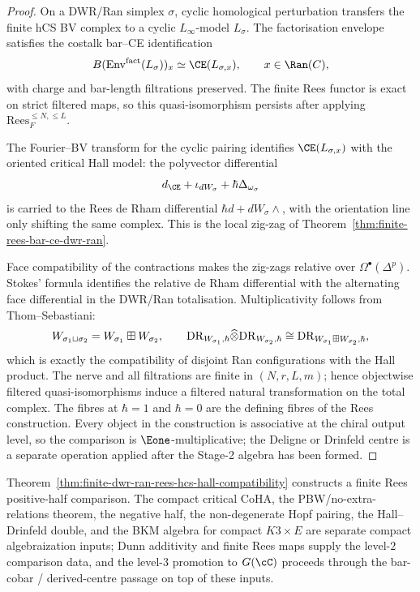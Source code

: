 \begin{proof}
On a DWR/Ran simplex \(\sigma\), cyclic homological perturbation
transfers the finite hCS BV complex to a cyclic \(L_\infty\)-model
\(L_\sigma\).  The factorisation envelope satisfies the costalk
bar--CE identification
\[
 B(\Env^{\mathrm{fact}}(L_\sigma))_x\simeq \CE(L_{\sigma,x}),
 \qquad x\in\Ran(C),
\]
with charge and bar-length filtrations preserved.  The finite Rees
functor is exact on strict filtered maps, so this quasi-isomorphism
persists after applying
\(\mathrm{Rees}_{F}^{\le N,\le L}\).

The Fourier--BV transform for the cyclic pairing identifies
\(\CE(L_{\sigma,x})\) with the oriented critical Hall model: the
polyvector differential
\[
 d_{\CE}+\iota_{dW_\sigma}+\hbar\Delta_{\omega_\sigma}
\]
is carried to the Rees de Rham differential
\(\hbar d+dW_\sigma\wedge\), with the orientation line only shifting
the same complex.  This is the local zig-zag of
Theorem~\ref{thm:finite-rees-bar-ce-dwr-ran}.

Face compatibility of the contractions makes the zig-zags relative
over \(\Omega^\bullet(\Delta^p)\).  Stokes' formula identifies the
relative de Rham differential with the alternating face differential
in the DWR/Ran totalisation.  Multiplicativity follows from
Thom--Sebastiani:
\[
 W_{\sigma_1\sqcup\sigma_2}=W_{\sigma_1}\boxplus W_{\sigma_2},
 \qquad
 \mathrm{DR}_{W_{\sigma_1},\hbar}\widehat\otimes
 \mathrm{DR}_{W_{\sigma_2},\hbar}
 \cong
 \mathrm{DR}_{W_{\sigma_1}\boxplus W_{\sigma_2},\hbar},
\]
which is exactly the compatibility of disjoint Ran configurations with
the Hall product.  The nerve and all filtrations are finite in
\((N,r,L,m)\); hence objectwise filtered quasi-isomorphisms induce a
filtered natural transformation on the total complex.  The fibres at
\(\hbar=1\) and \(\hbar=0\) are the defining fibres of the Rees
construction.  Every object in the construction is associative at the
chiral output level, so the comparison is \(\Eone\)-multiplicative;
	the Deligne or Drinfeld centre is a separate operation applied after
	the Stage-2 algebra has been formed.
\end{proof}

\begin{remark}
\label{rem:finite-rees-hcs-hall-positive-half-scope}
Theorem~\ref{thm:finite-dwr-ran-rees-hcs-hall-compatibility}
constructs a finite Rees positive-half comparison. The compact
critical CoHA, the PBW/no-extra-relations theorem, the negative half,
the non-degenerate Hopf pairing, the Hall--Drinfeld double, and the
BKM algebra for compact $K3 \times E$ are separate compact
algebraization inputs; Dunn additivity and finite Rees maps supply
the level-$2$ comparison data, and the level-$3$ promotion to
$G(\cC)$ proceeds through the bar-cobar / derived-centre passage on
top of these inputs.
\end{remark}

